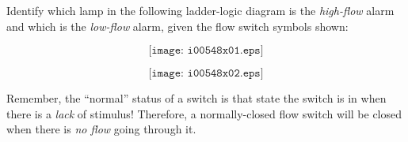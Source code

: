 

Identify which lamp in the following ladder-logic diagram is the {\it high-flow} alarm and which is the {\it low-flow} alarm, given the flow switch symbols shown:

$$\texttt{[image: i00548x01.eps]}$$







$$\texttt{[image: i00548x02.eps]}$$







Remember, the ``normal'' status of a switch is that state the switch is in when there is a {\it lack} of stimulus!  Therefore, a normally-closed flow switch will be closed when there is {\it no flow} going through it.




